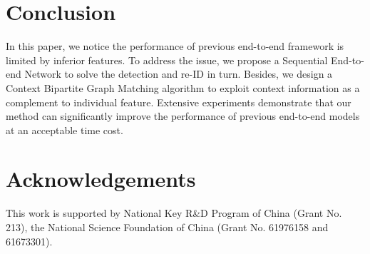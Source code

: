 \documentclass[letterpaper]{article} \usepackage{aaai21}  \usepackage{times}  \usepackage{helvet} \usepackage{courier}  \usepackage[hyphens]{url}  \usepackage{graphicx} \urlstyle{rm} \def\UrlFont{\rm}  \usepackage{natbib}  \usepackage{caption} \usepackage{multirow}
\begin{document}
\section{Conclusion}
In this paper, we notice the performance of previous end-to-end framework is limited by inferior features. To address the issue, we propose a Sequential End-to-end Network to solve the detection and re-ID in turn. Besides, we design a Context Bipartite Graph Matching algorithm to exploit context information as a complement to individual feature. Extensive experiments demonstrate that our method can significantly improve the performance of previous end-to-end models at an acceptable time cost.

\section{Acknowledgements}
This work is supported by National Key R\&D Program of China (Grant No. 213), the National Science Foundation of China (Grant No. 61976158 and 61673301).


\end{document}
